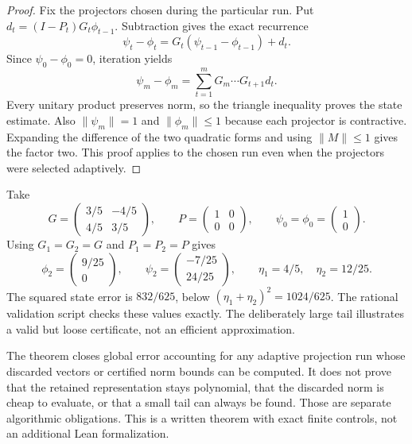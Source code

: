 \begin{proof}
Fix the projectors chosen during the particular run. Put $d_t=(I-P_t)G_t\phi_{t-1}$. Subtraction gives the exact recurrence
\[
\psi_t-\phi_t=G_t(\psi_{t-1}-\phi_{t-1})+d_t.
\]
Since $\psi_0-\phi_0=0$, iteration yields
\[
\psi_m-\phi_m=\sum_{t=1}^mG_m\cdots G_{t+1}d_t.
\]
Every unitary product preserves norm, so the triangle inequality proves the state estimate. Also $\|\psi_m\|=1$ and $\|\phi_m\|\le1$ because each projector is contractive. Expanding the difference of the two quadratic forms and using $\|M\|\le1$ gives the factor two. This proof applies to the chosen run even when the projectors were selected adaptively.
\end{proof}

\begin{example}
Take
\[
G=\begin{pmatrix}3/5&-4/5\\4/5&3/5\end{pmatrix},
\qquad
P=\begin{pmatrix}1&0\\0&0\end{pmatrix},
\qquad
\psi_0=\phi_0=\begin{pmatrix}1\\0\end{pmatrix}.
\]
Using $G_1=G_2=G$ and $P_1=P_2=P$ gives
\[
\phi_2=\begin{pmatrix}9/25\\0\end{pmatrix},\qquad
\psi_2=\begin{pmatrix}-7/25\\24/25\end{pmatrix},\qquad
\eta_1=4/5,\quad\eta_2=12/25.
\]
The squared state error is $832/625$, below $(\eta_1+\eta_2)^2=1024/625$. The rational validation script checks these values exactly. The deliberately large tail illustrates a valid but loose certificate, not an efficient approximation.
\end{example}

The theorem closes global error accounting for any adaptive projection run whose discarded vectors or certified norm bounds can be computed. It does not prove that the retained representation stays polynomial, that the discarded norm is cheap to evaluate, or that a small tail can always be found. Those are separate algorithmic obligations. This is a written theorem with exact finite controls, not an additional Lean formalization.
